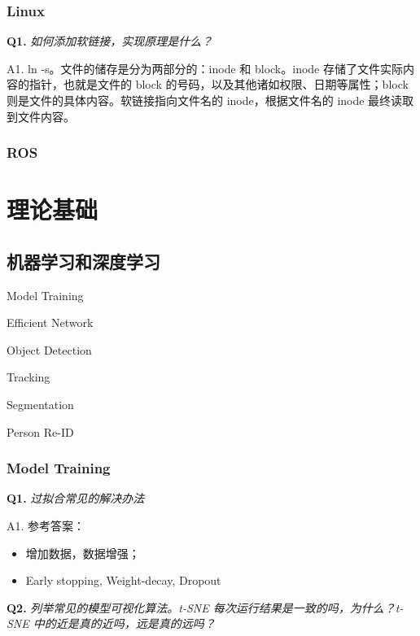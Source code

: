 \documentclass[cn,10pt,math=newtx,citestyle=gb7714-2015,bibstyle=gb7714-2015]{elegantbook}
\begin{document}
\subsection{Linux}

\textbf{Q1.} \textit{如何添加软链接，实现原理是什么？}

A1. ln -s。文件的储存是分为两部分的：inode 和 block。inode 存储了文件实际内容的指针，也就是文件的 block 的号码，以及其他诸如权限、日期等属性；block则是文件的具体内容。软链接指向文件名的 inode，根据文件名的 inode 最终读取到文件内容。\\

\subsection{ROS}

\newpage


\chapter{理论基础}

\section{机器学习和深度学习}

\begin{introduction}
\item Model Training
\item Efficient Network
\item Object Detection
\item Tracking
\item Segmentation
\item Person Re-ID
\end{introduction}

\subsection{Model Training}

\textbf{Q1.} \textit{过拟合常见的解决办法}

A1. 参考答案：

\begin{itemize}
  \item 增加数据，数据增强；
  \item Early stopping, Weight-decay, Dropout\\
\end{itemize}

\textbf{Q2.} \textit{列举常见的模型可视化算法。t-SNE 每次运行结果是一致的吗，为什么？t-SNE 中的近是真的近吗，远是真的远吗？}
\end{document}
